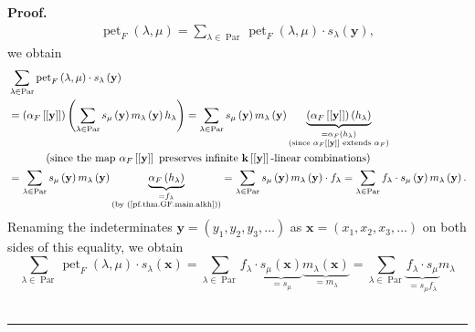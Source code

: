 \documentclass[numbers=enddot,12pt,final,onecolumn,notitlepage]{scrartcl}%
\theoremstyle{definition}
\newenvironment{proof}[1][Proof]{\noindent\textbf{#1.} }{\ \rule{0.5em}{0.5em}}
\let\sumnonlimits\sum
\renewcommand{\sum}{\sumnonlimits\limits}
\newenvironment{verlong}{}{}
\begin{document}
\begin{verlong}
\begin{proof}
\begin{align*}
\operatorname*{pet}\nolimits_{F}\left(  \lambda,\mu\right)  =\sum_{\lambda
\in\operatorname*{Par}}\operatorname*{pet}\nolimits_{F}\left(  \lambda
,\mu\right)  \cdot s_{\lambda}\left(  \mathbf{y}\right)  ,
\end{align*}
we obtain%
\begin{align*}
&  \sum_{\lambda\in\operatorname*{Par}}\operatorname*{pet}\nolimits_{F}\left(
\lambda,\mu\right)  \cdot s_{\lambda}\left(  \mathbf{y}\right) \\
&  =\left(  \alpha_{F}\left[  \left[  \mathbf{y}\right]  \right]  \right)
\left(  \sum_{\lambda\in\operatorname*{Par}}s_{\mu}\left(  \mathbf{y}\right)
m_{\lambda}\left(  \mathbf{y}\right)  h_{\lambda}\right)  =\sum_{\lambda
\in\operatorname*{Par}}s_{\mu}\left(  \mathbf{y}\right)  m_{\lambda}\left(
\mathbf{y}\right)  \underbrace{\left(  \alpha_{F}\left[  \left[
\mathbf{y}\right]  \right]  \right)  \left(  h_{\lambda}\right)
}_{\substack{=\alpha_{F}\left(  h_{\lambda}\right)  \\\text{(since }\alpha
_{F}\left[  \left[  \mathbf{y}\right]  \right]  \text{ extends }\alpha
_{F}\text{)}}}\\
&  \ \ \ \ \ \ \ \ \ \ \left(  \text{since the map }\alpha_{F}\left[  \left[
\mathbf{y}\right]  \right]  \text{ preserves infinite }\mathbf{k}\left[
\left[  \mathbf{y}\right]  \right]  \text{-linear combinations}\right) \\
&  =\sum_{\lambda\in\operatorname*{Par}}s_{\mu}\left(  \mathbf{y}\right)
m_{\lambda}\left(  \mathbf{y}\right)  \underbrace{\alpha_{F}\left(
h_{\lambda}\right)  }_{\substack{=f_{\lambda}\\\text{(by
(\ref{pf.thm.GF.main.alkh}))}}}=\sum_{\lambda\in\operatorname*{Par}}s_{\mu
}\left(  \mathbf{y}\right)  m_{\lambda}\left(  \mathbf{y}\right)  \cdot
f_{\lambda}=\sum_{\lambda\in\operatorname*{Par}}f_{\lambda}\cdot s_{\mu
}\left(  \mathbf{y}\right)  m_{\lambda}\left(  \mathbf{y}\right)  .
\end{align*}
Renaming the indeterminates $\mathbf{y}=\left(  y_{1},y_{2},y_{3}%
,\ldots\right)  $ as $\mathbf{x}=\left(  x_{1},x_{2},x_{3},\ldots\right)  $ on
both sides of this equality, we obtain%
\[
\sum_{\lambda\in\operatorname*{Par}}\operatorname*{pet}\nolimits_{F}\left(
\lambda,\mu\right)  \cdot s_{\lambda}\left(  \mathbf{x}\right)  =\sum
_{\lambda\in\operatorname*{Par}}f_{\lambda}\cdot\underbrace{s_{\mu}\left(
\mathbf{x}\right)  }_{=s_{\mu}}\underbrace{m_{\lambda}\left(  \mathbf{x}%
\right)  }_{=m_{\lambda}}=\sum_{\lambda\in\operatorname*{Par}}%
\underbrace{f_{\lambda}\cdot s_{\mu}}_{=s_{\mu}f_{\lambda}}m_{\lambda}%
\]
\end{proof}
\end{verlong}
\end{document}
